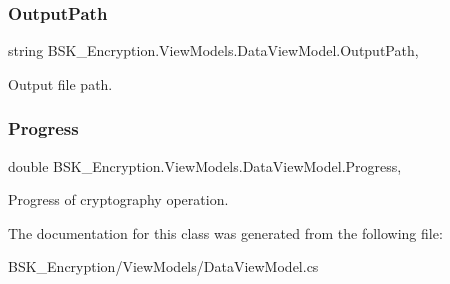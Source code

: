 \subsubsection{\texorpdfstring{Output\+Path}{OutputPath}}
{\footnotesize\ttfamily string B\+S\+K\+\_\+\+Encryption.\+View\+Models.\+Data\+View\+Model.\+Output\+Path\hspace{0.3cm}{\ttfamily [get]}, {\ttfamily [set]}}



Output file path. 

\mbox{\label{class_b_s_k___encryption_1_1_view_models_1_1_data_view_model_a3473fbb812cdfe8a23b7f99c2e8db170}} 
\subsubsection{\texorpdfstring{Progress}{Progress}}
{\footnotesize\ttfamily double B\+S\+K\+\_\+\+Encryption.\+View\+Models.\+Data\+View\+Model.\+Progress\hspace{0.3cm}{\ttfamily [get]}, {\ttfamily [set]}}



Progress of cryptography operation. 



The documentation for this class was generated from the following file\+:\begin{DoxyCompactItemize}
\item 
B\+S\+K\+\_\+\+Encryption/\+View\+Models/Data\+View\+Model.\+cs\end{DoxyCompactItemize}
